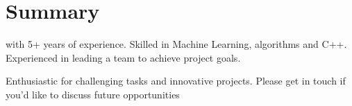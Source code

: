 \section{Summary}
\summaryPosition\space with 5+ years of experience. Skilled in Machine Learning, algorithms and C++. Experienced in leading a team to achieve project goals.

Enthusiastic for challenging tasks and innovative projects. Please get in touch if you'd like to discuss future opportunities
